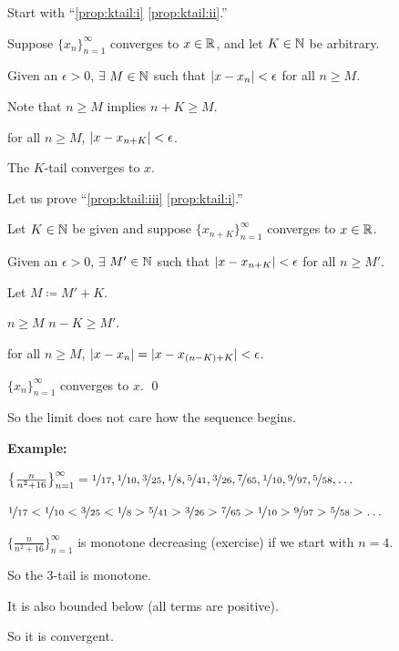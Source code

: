\documentclass[10pt,aspectratio=169]{beamer}
\begin{document}
\begin{frame}
Start with ``\eqref{prop:ktail:i} \thus \eqref{prop:ktail:ii}.''

\pause
Suppose $\{x_n \}_{n=1}^\infty$ converges to $x \in {\mathbb{R}}$, and let $K \in {\mathbb{N}}$ be arbitrary.

\pause
Given an $\epsilon > 0$, $\exists$ $M \in {\mathbb{N}}$ such that
$\lvert {x-x_n} \rvert < \epsilon$ for all $n \geq M$.

\pause
Note that $n \geq M$ implies $n+K \geq M$.

\pause
\thus \quad for all $n \geq M$, \quad
$\lvert {x-x_{n+K}} \rvert < \epsilon$.

\pause
\thus \quad The $K$-tail converges to $x$.

\medskip
\pause

Let us prove ``\eqref{prop:ktail:iii} \thus \eqref{prop:ktail:i}.''

\pause
Let $K \in {\mathbb{N}}$ be given and suppose $\{ x_{n+K} \}_{n=1}^\infty$ converges to $x \in {\mathbb{R}}$.

\pause
Given an $\epsilon > 0$, $\exists$ $M' \in {\mathbb{N}}$ such that
$\lvert {x-x_{n+K}} \rvert < \epsilon$ for all $n \geq M'$.

\pause
Let $M \coloneqq M'+K$.

\pause
$n \geq M$ \wthus $n-K \geq M'$.

\pause
\thus \quad for all $n \geq M$, \quad
$\lvert {x-x_n} \rvert = \lvert {x-x_{(n-K)+K}} \rvert < \epsilon$.

\pause
\thus \quad $\{ x_n \}_{n=1}^\infty$ converges to $x$.
\qed

\end{frame}

\begin{frame}
So the limit does not care how the sequence begins.

\medskip
\pause

\textbf{Example:}
\medskip

$\bigl\{\frac{n}{n^2+16} \bigr\}_{n=1}^\infty =
\nicefrac{1}{17},
\nicefrac{1}{10},
\nicefrac{3}{25},
\nicefrac{1}{8},
\nicefrac{5}{41},
\nicefrac{3}{26},
\nicefrac{7}{65},
\nicefrac{1}{10},
\nicefrac{9}{97},
\nicefrac{5}{58},\ldots$

\pause
\medskip

$
\nicefrac{1}{17} <
\nicefrac{1}{10} <
\nicefrac{3}{25} <
\nicefrac{1}{8} >
\nicefrac{5}{41} >
\nicefrac{3}{26} >
\nicefrac{7}{65} >
\nicefrac{1}{10} >
\nicefrac{9}{97} >
\nicefrac{5}{58} > \ldots$

\medskip
\pause

$\bigl\{\frac{n}{n^2+16} \bigr\}_{n=1}^\infty$ is monotone decreasing (exercise) if we start with $n=4$.

\medskip
\pause

So the 3-tail is monotone.

\medskip
\pause

It is also bounded below (all terms are positive).

\medskip
\pause

So it is convergent.
\end{frame}
\end{document}

